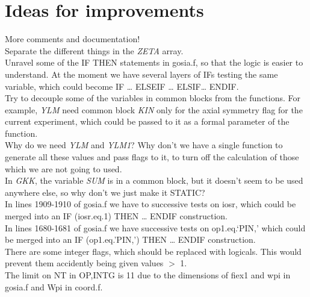 \chapter{Ideas for improvements}

More comments and documentation!\\

Separate the different things in the \emph{ZETA} array.\\

Unravel some of the IF THEN statements in gosia.f, so that the logic is
easier to understand. At the moment we have several layers of IFs testing
the same variable, which could become IF {\ldots} ELSEIF {\ldots}
ELSIF{\ldots} ENDIF.\\

Try to decouple some of the variables in common blocks from the functions.
For example, \emph{YLM} need common block \emph{KIN} only for the axial
symmetry flag for the current experiment, which could be passed to it as a
formal parameter of the function.\\

Why do we need \emph{YLM} and \emph{YLM1}? Why don't we have a single function
to generate all these values and pass flags to it, to turn off the
calculation of those which we are not going to used.\\

In \emph{GKK}, the variable \emph{SUM} is in a common block, but it doesn't
seem to be used anywhere else, so why don't we just make it STATIC?\\

In lines 1909-1910 of gosia.f we have to successive tests on iosr, which
could be merged into an IF (iosr.eq.1) THEN {\ldots} ENDIF construction.\\

In lines 1680-1681 of gosia.f we have successive tests on op1.eq.`PIN,'
which could be merged into an IF (op1.eq.'PIN,') THEN {\ldots} ENDIF
construction.\\

There are some integer flags, which should be replaced with logicals. This
would prevent them accidently being given values $>$ 1.\\

The limit on NT in OP,INTG is 11 due to the dimensions of fiex1 and wpi in
gosia.f and Wpi in coord.f.\\

